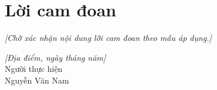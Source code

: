 \chapter*{Lời cam đoan}
\noindent\textit{[Chờ xác nhận nội dung lời cam đoan theo mẫu áp dụng.]}
\vfill
\begin{flushright}
\textit{[Địa điểm, ngày tháng năm]}\\[1em]
Người thực hiện\\[3em]
Nguyễn Văn Nam
\end{flushright}
